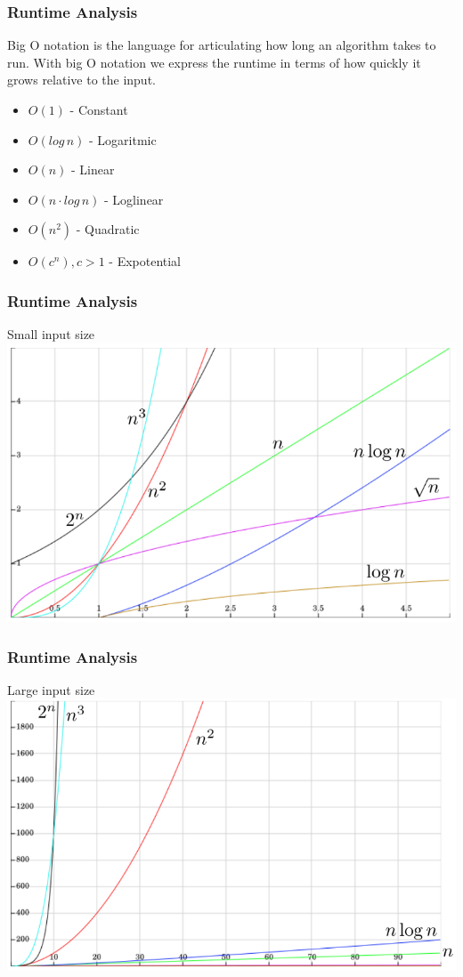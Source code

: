 \begin{frame}[fragile]
\frametitle{Runtime Analysis}
Big O notation is the language for articulating how long an algorithm takes to run.
With big O notation we express the runtime in terms of how quickly it grows relative to the input.

\begin{itemize}
\item $O(1)$ - Constant
\item $O(log \, n)$ - Logaritmic
\item $O(n)$ - Linear
\item $O(n \cdot log \, n)$ - Loglinear
\item $O(n^2)$ - Quadratic
\item $O(c^n), c > 1$ - Expotential
\end{itemize}

\end{frame}

\begin{frame}[fragile]
\frametitle{Runtime Analysis}
Small input size\\
\centering\includegraphics[scale=0.4]{img/runtime1.png}
\end{frame}

\begin{frame}[fragile]
\frametitle{Runtime Analysis}
Large input size\\
\centering\includegraphics[scale=0.4]{img/runtime2.png}
\end{frame}

